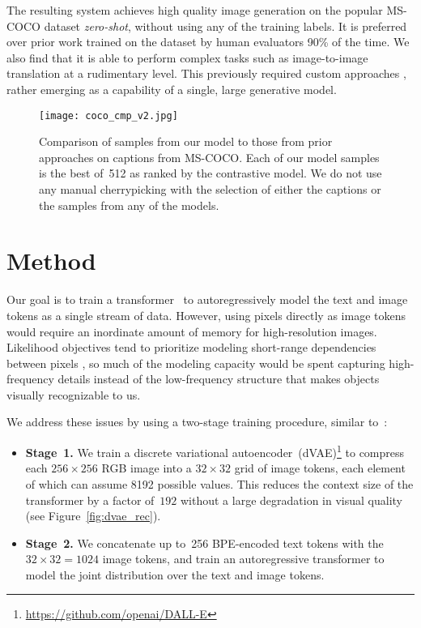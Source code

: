 \documentclass{article}
\begin{document}
The resulting system achieves high quality image generation on the popular MS-COCO dataset \textit{zero-shot}, without using any of the training labels. It is preferred over prior work trained on the dataset by human evaluators 90\% of the time. We also find that it is able to perform complex tasks such as image-to-image translation at a rudimentary level. This previously required custom approaches \citep{isola2017image}, rather
emerging as a capability of a single, large generative model.


\begin{figure*}[t]
    \centering
    \texttt{[image: coco\_cmp\_v2.jpg]}
    \caption{Comparison of samples from our model to those from prior approaches on captions from MS-COCO. Each of our model samples is the best of~512 as ranked by the contrastive model. We do not use any manual cherrypicking with the selection of either the captions or the samples from any of the models.}
    \label{fig:coco_cmp}
\end{figure*}
\section{Method}
Our goal is to train a transformer~\cite{vaswani2017attention} to autoregressively model the text and image tokens as a single stream of data. However, using pixels directly as image tokens would require an inordinate amount of memory for high-resolution images. Likelihood objectives tend to prioritize modeling short-range dependencies between pixels \citep{salimans2017pixelcnn++}, so much of the modeling capacity would be spent capturing high-frequency details instead of the low-frequency structure that makes objects visually recognizable to us.

We address these issues by using a two-stage training procedure, similar to~\cite{oord2017neural,razavi2019generating}:
\begin{itemize}
    \item \textbf{Stage~1.} We train a discrete variational autoencoder~(dVAE)\footnote{\url{https://github.com/openai/DALL-E}} to compress each $256 \times 256$ RGB image into a $32 \times 32$ grid of image tokens, each element of which can assume \num{8192} possible values. This reduces the context size of the transformer by a factor of~$192$ without a large degradation in visual quality (see Figure~\ref{fig:dvae_rec}).
    \item \textbf{Stage~2.} We concatenate up to~256 BPE-encoded text tokens with the~$32 \times 32 = 1024$ image tokens, and train an autoregressive transformer to model the joint distribution over the text and image tokens.
\end{itemize}
\end{document}
